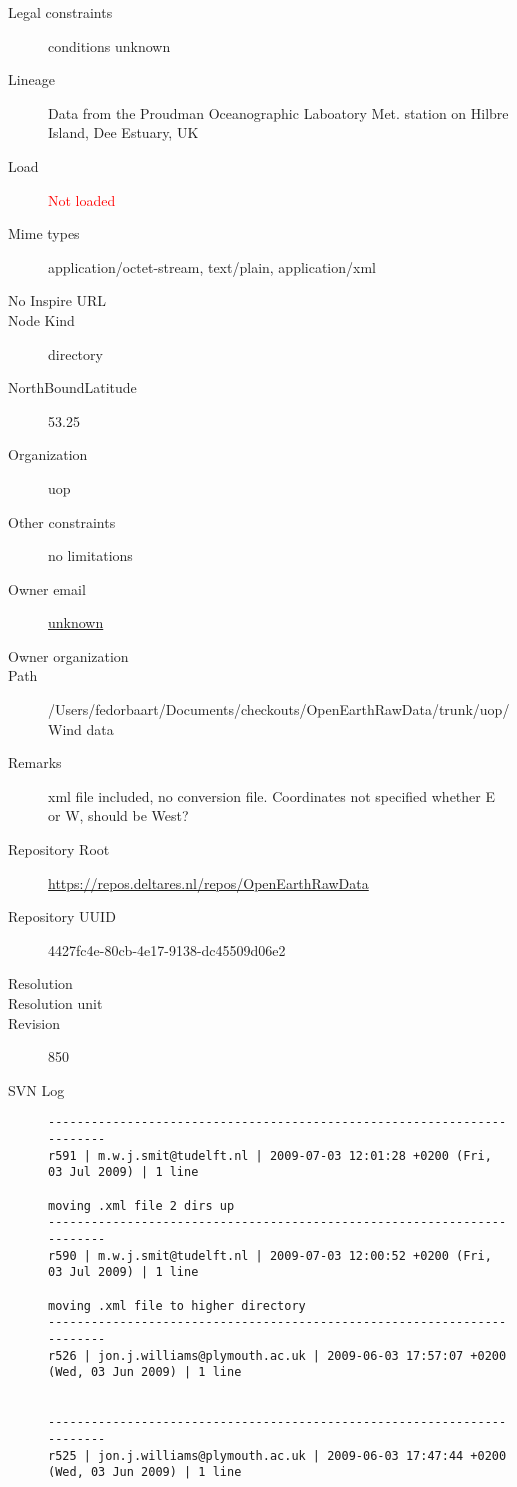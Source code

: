 \documentclass[9]{report}
\begin{document}
\begin{description}
  \item[Legal constraints] conditions unknown
  \item[Lineage] Data from the Proudman Oceanographic Laboatory Met. station on Hilbre Island, Dee Estuary, UK
  \item[Load] \textcolor{red}{Not loaded}
  \item[Mime types] application/octet-stream, text/plain, application/xml
  \item[No Inspire URL] 
  \item[Node Kind] directory
  \item[NorthBoundLatitude] 53.25
  \item[Organization] uop
  \item[Other constraints] no limitations
  \item[Owner email] \href{mailto:unknown}{unknown}
  \item[Owner organization] 
  \item[Path] /Users/fedorbaart/Documents/checkouts/OpenEarthRawData/trunk/uop/Wind data
  \item[Remarks] xml file included, no conversion file. Coordinates not specified whether E or W, should be West?
  \item[Repository Root] \href{https://repos.deltares.nl/repos/OpenEarthRawData}{https://repos.deltares.nl/repos/OpenEarthRawData}
  \item[Repository UUID] 4427fc4e-80cb-4e17-9138-dc45509d06e2
  \item[Resolution] 
  \item[Resolution unit] 
  \item[Revision] 850
  \item[SVN Log] \begin{verbatim}
------------------------------------------------------------------------
r591 | m.w.j.smit@tudelft.nl | 2009-07-03 12:01:28 +0200 (Fri, 03 Jul 2009) | 1 line

moving .xml file 2 dirs up
------------------------------------------------------------------------
r590 | m.w.j.smit@tudelft.nl | 2009-07-03 12:00:52 +0200 (Fri, 03 Jul 2009) | 1 line

moving .xml file to higher directory
------------------------------------------------------------------------
r526 | jon.j.williams@plymouth.ac.uk | 2009-06-03 17:57:07 +0200 (Wed, 03 Jun 2009) | 1 line


------------------------------------------------------------------------
r525 | jon.j.williams@plymouth.ac.uk | 2009-06-03 17:47:44 +0200 (Wed, 03 Jun 2009) | 1 line



\end{verbatim}
\end{description}
\end{document}
